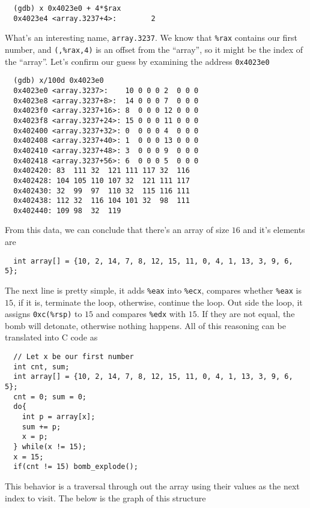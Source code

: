 {\renewcommand\fcolorbox[4][]{\textcolor{cyan}{\strut#4}}
\begin{verbatim}
  (gdb) x 0x4023e0 + 4*$rax
  0x4023e4 <array.3237+4>:        2
\end{verbatim}
}\noindent
What's an interesting name, \verb+array.3237+. We know that \verb+%rax+ contains our first number, and \verb+(,%rax,4)+ is an offset from the ``array'', so it might be the index of the ``array''. Let's confirm our guess by examining the address \verb+0x4023e0+
{\renewcommand\fcolorbox[4][]{\textcolor{cyan}{\strut#4}}
\begin{verbatim}
  (gdb) x/100d 0x4023e0
  0x4023e0 <array.3237>:    10 0 0 0 2  0 0 0
  0x4023e8 <array.3237+8>:  14 0 0 0 7  0 0 0
  0x4023f0 <array.3237+16>: 8  0 0 0 12 0 0 0
  0x4023f8 <array.3237+24>: 15 0 0 0 11 0 0 0
  0x402400 <array.3237+32>: 0  0 0 0 4  0 0 0
  0x402408 <array.3237+40>: 1  0 0 0 13 0 0 0
  0x402410 <array.3237+48>: 3  0 0 0 9  0 0 0
  0x402418 <array.3237+56>: 6  0 0 0 5  0 0 0
  0x402420: 83  111 32  121 111 117 32  116
  0x402428: 104 105 110 107 32  121 111 117
  0x402430: 32  99  97  110 32  115 116 111
  0x402438: 112 32  116 104 101 32  98  111
  0x402440: 109 98  32  119
\end{verbatim}
}\noindent
From this data, we can conclude that there's an array of size $16$ and it's elements are
{\renewcommand\fcolorbox[4][]{\textcolor{black}{\strut#4}}
\begin{verbatim}
  int array[] = {10, 2, 14, 7, 8, 12, 15, 11, 0, 4, 1, 13, 3, 9, 6, 5};
\end{verbatim}
}\noindent
The next line is pretty simple, it adds \verb+%eax+ into \verb+%ecx+, compares whether \verb+%eax+ is $15$, if it is, terminate the loop, otherwise, continue the loop. Out side the loop, it assigns \verb+0xc(%rsp)+ to $15$ and compares \verb+%edx+ with $15$. If they are not equal, the bomb will detonate, otherwise nothing happens. All of this reasoning can be translated into C code as
{\renewcommand\fcolorbox[4][]{\textcolor{black}{\strut#4}}
\begin{verbatim}
  // Let x be our first number
  int cnt, sum;
  int array[] = {10, 2, 14, 7, 8, 12, 15, 11, 0, 4, 1, 13, 3, 9, 6, 5};
  cnt = 0; sum = 0;
  do{
    int p = array[x];
    sum += p;
    x = p;
  } while(x != 15);
  x = 15;
  if(cnt != 15) bomb_explode();
\end{verbatim}
}\noindent
This behavior is a traversal through out the array using their values as the next index to visit. The below is the graph of this structure
